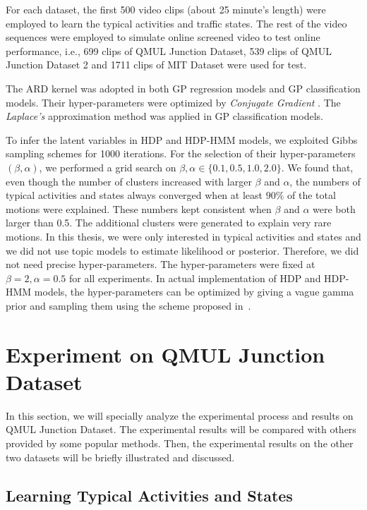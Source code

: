 For each dataset, the first 500 video clips (about 25 minute's length) were employed to learn the typical activities and traffic states. The rest of the video sequences were employed to simulate online screened video to test online performance, i.e., 699 clips of QMUL Junction Dataset, 539 clips of QMUL Junction Dataset 2 and 1711 clips of MIT Dataset were used for test.

The ARD kernel was adopted in both GP regression models and GP classification models. Their hyper-parameters were optimized by \emph{Conjugate Gradient} \cite{nocedal2006numerical}. The \emph{Laplace's } approximation method \cite{williams1998bayesian} was applied in GP classification models.

To infer the latent variables in HDP and HDP-HMM models, we exploited Gibbs sampling schemes for 1000 iterations. For the selection of their hyper-parameters $(\beta,\alpha)$, we performed a grid search on $\beta, \alpha\in \{0.1, 0.5, 1.0, 2.0\}$. 
We found that, even though the number of clusters increased with larger $\beta$ and $\alpha$, the numbers of typical activities and states always converged when at least $90\%$ of the total motions were explained. These numbers kept consistent when $\beta$ and $\alpha$ were both larger than 0.5. The additional clusters were generated to explain very rare motions. In this thesis, we were only interested in typical activities and states and we did not use topic models to estimate likelihood or posterior. Therefore, we did not need precise hyper-parameters. The hyper-parameters were fixed at $\beta = 2, \alpha=0.5$ for all experiments. In actual implementation of HDP and HDP-HMM models, the hyper-parameters can be optimized by giving a vague gamma prior and sampling them using the scheme proposed in~\cite{teh2006hdp}.


\section{Experiment on QMUL Junction Dataset}
\label{exp:qmul}
In this section, we will specially analyze the experimental process and results on QMUL Junction Dataset. The experimental results will be compared with others provided by some popular methods. Then, the experimental results on the other two datasets will be briefly illustrated and discussed.

\subsection{Learning Typical Activities and States}
\label{exp:qmul:activity_and_state}


